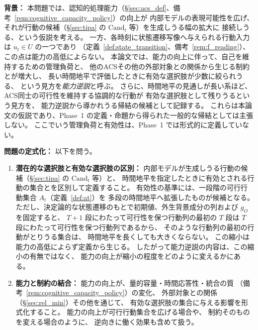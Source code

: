 \begin{problem}
\label{prob:capability_paradox}

\textbf{背景：}
本問題では、認知的処理能力（\S\ref{sec:acs_def}、備考~\ref{rem:cognitive_capacity_policy}）の向上が
内部モデルの表現可能性を広げ、
それが行動の候補（\S\ref{sec:tipa} の $\mathrm{Cand}_t$ 等）を生成しうる幅の拡大に
接続しうる、という仮説を考える。
一方、各時刻に状態遷移写像へ与えられる行動入力は $u_t\in U$ の一つであり
（定義~\ref{def:state_transition}、備考~\ref{rem:f_reading}）、
この点は能力の高低によらない。
本論文では、能力の向上に伴って、自己を維持するための管理負荷と、
他のACSその他の外部対象との関係から生じる制約とが増大し、
長い時間地平で評価したときに有効な選択肢が少数に絞られうる、
という見方を\emph{能力逆説}と呼ぶ。
さらに、時間地平の見通しが長い系ほど、
ACS同士の可行性を維持する協調的な行動が
有効な選択肢として残りうるという見方を、
能力逆説から導かれうる帰結の候補として記録する。
これらは本論文の仮説であり、Phase~1 の定義・命題から得られた一般的な帰結としては主張しない。
ここでいう管理負荷と有効性は、Phase~1 では形式的に定義していない。

\textbf{問題の定式化：}
以下を問う。

\begin{enumerate}
  \item[(i)] \textbf{潜在的な選択肢と有効な選択肢の区別：}
  内部モデルが生成しうる行動の候補（\S\ref{sec:tipa} の $\mathrm{Cand}_t$ 等）と、
  時間地平を指定したときに有効とされる行動の集合とを区別して定義すること。
  有効性の基準には、一段階の可行行動集合 $A_t$（定義~\ref{def:at}）を
  多段の時間地平へ拡張したものが候補となる。
  ただし、決定論的な状態遷移のもとで初期値、外生背景成分の列および $g_O$ を固定すると、
  $T+1$ 段にわたって可行性を保つ行動列の最初の $T$ 段は
  $T$ 段にわたって可行性を保つ行動列であるから、
  そのような行動列の最初の行動がとりうる集合は、
  時間地平を長くしても大きくならない。
  この縮小は能力の高低によらず定義から生じる。
  したがって能力逆説の内容は、この縮小の有無ではなく、
  能力の向上が縮小の程度をどのように変えるかにある。

  \item[(ii)] \textbf{能力と制約の結合：}
  能力の向上が、量的容量・時間応答性・統合の質
  （備考~\ref{rem:cognitive_capacity_policy}）の変化、
  外部対象との関係（\S\ref{sec:rel_min}）その他を通じて、
  有効な選択肢の集合に与える影響を形式化すること。
  能力の向上が可行行動集合を広げる場合や、
  制約そのものを変える場合のように、
  逆向きに働く効果も含めて扱う。


\end{enumerate}
\end{problem}
